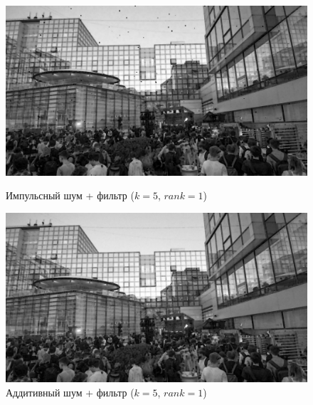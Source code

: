 \documentclass[a4paper]{article}
\begin{document}
\begin{figure}[H]
    \begin{minipage}{0.49\textwidth}
        \centering \includegraphics[width=\textwidth]{images/3_nonlinear_filters/impulse - rang (k=5, rank=1).jpg}
        \caption{Импульсный шум + фильтр ($k = 5$, $rank = 1$)}
    \end{minipage}\hfill
    \begin{minipage}{0.49\textwidth}
        \centering \includegraphics[width=\textwidth]{images/3_nonlinear_filters/additive - rang (k=5, rank=1).jpg}
        \caption{Аддитивный шум + фильтр ($k = 5$, $rank = 1$)}
    \end{minipage}
\end{figure}
\end{document}
